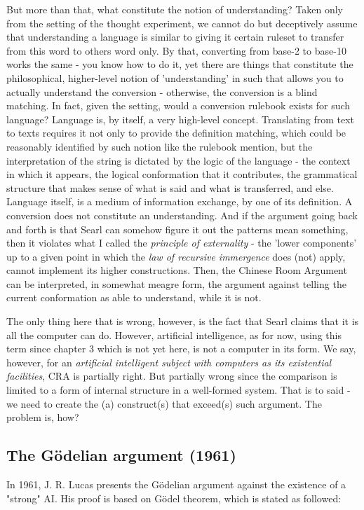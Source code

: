 But more than that, what constitute the notion of understanding? Taken only from the setting of the thought experiment, we cannot do but deceptively assume that understanding a language is similar to giving it certain ruleset to transfer from this word to others word only. By that, converting from base-2 to base-10 works the same - you know how to do it, yet there are things that constitute the philosophical, higher-level notion of 'understanding' in such that allows you to actually understand the conversion - otherwise, the conversion is a blind matching. In fact, given the setting, would a conversion rulebook exists for such language? Language is, by itself, a very high-level concept. Translating from text to texts requires it not only to provide the definition matching, which could be reasonably identified by such notion like the rulebook mention, but the interpretation of the string is dictated by the logic of the language - the context in which it appears, the logical conformation that it contributes, the grammatical structure that makes sense of what is said and what is transferred, and else. Language itself, is a medium of information exchange, by one of its definition. A conversion does not constitute an understanding. And if the argument going back and forth is that Searl can somehow figure it out the patterns mean something, then it violates what I called the \textit{principle of externality} - the 'lower components' up to a given point in which the \textit{law of recursive immergence} does (not) apply, cannot implement its higher constructions. Then, the Chinese Room Argument can be interpreted, in somewhat meagre form, the argument against telling the current conformation as able to understand, while it is not.

The only thing here that is wrong, however, is the fact that Searl claims that it is all the computer can do. However, artificial intelligence, as for now, using this term since chapter 3 which is not yet here, is not a computer in its form. We say, however, for an \textit{artificial intelligent subject with computers as its existential facilities}, CRA is partially right. But partially wrong since the comparison is limited to a form of internal structure in a well-formed system. That is to said - we need to create the (a) construct(s) that exceed(s) such argument. The problem is, how?
\subsection{The Gödelian argument (1961)}
In 1961, J. R. Lucas presents the Gödelian argument against the existence of a "strong" AI. His proof is based on Gödel theorem, which is stated as followed:

